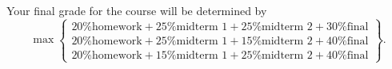\documentclass{lnotes}
\begin{document}
Your final grade for the course will be determined by
\[ \max\left\{
	\begin{array}{cccc}
		\text{20\% homework} + \text{25\% midterm 1} + \text{25\% midterm 2} + \text{30\% final} \\
		\text{20\% homework} + \text{25\% midterm 1} + \text{15\% midterm 2} + \text{40\% final} \\
		\text{20\% homework} + \text{15\% midterm 1} + \text{25\% midterm 2} + \text{40\% final}
	\end{array}
\right\}. \]

\printbibliography


















\end{document}
